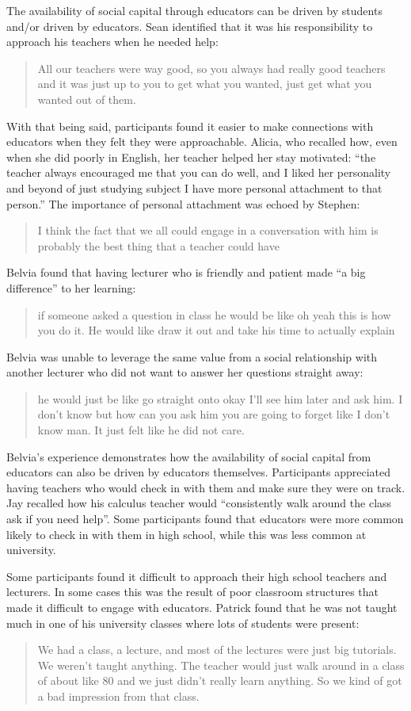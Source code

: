 The availability of social capital through educators can be driven by students and/or driven by educators. Sean identified that it was his responsibility to approach his teachers when he needed help: \blockquote{All our teachers were way good, so you always had really good teachers and it was just up to you to get what you wanted, just get what you wanted out of them.} With that being said, participants found it easier to make connections with educators when they felt they were approachable. Alicia, who recalled how, even when she did poorly in English, her teacher helped her stay motivated: ``the teacher always encouraged me that you can do well, and I liked her personality and beyond of just studying subject I have more personal attachment to that person.'' The importance of personal attachment was echoed by Stephen: \blockquote{I think the fact that we all could engage in a conversation with him is probably the best thing that a teacher could have}. Belvia found that having lecturer who is friendly and patient made ``a big difference'' to her learning: \blockquote{if someone asked a question in class he would be like oh yeah this is how you do it. He would like draw it out and take his time to actually explain}. Belvia was unable to leverage the same value from a social relationship with another lecturer who did not want to answer her questions straight away: \blockquote{he would just be like go straight onto okay I'll see him later and ask him. I don't know but how can you ask him you are going to forget like I don't know man. It just felt like he did not care.} Belvia's experience demonstrates how the availability of social capital from educators can also be driven by educators themselves. Participants appreciated having teachers who would check in with them and make sure they were on track. Jay recalled how his calculus teacher would ``consistently walk around the class ask if you need help''. Some participants found that educators were more common likely to check in with them in high school, while this was less common at university. 

Some participants found it difficult to approach their high school teachers and lecturers. In some cases this was the result of poor classroom structures that made it difficult to engage with educators. Patrick found that he was not taught much in one of his university classes where lots of students were present: \blockquote{We had a class, a lecture, and most of the lectures were just big tutorials. We weren't taught anything. The teacher would just walk around in a class of about like 80 and we just didn't really learn anything. So we kind of got a bad impression from that class.} 

